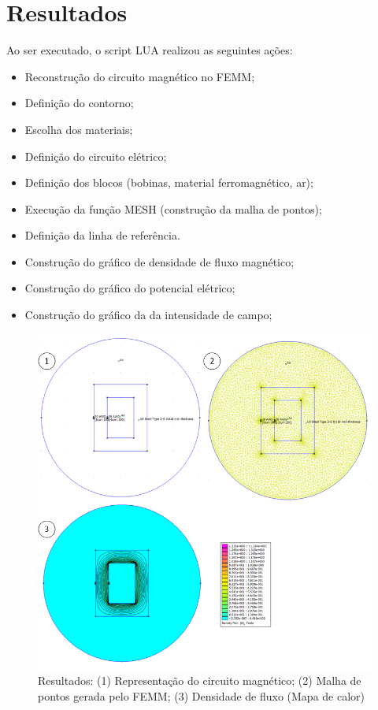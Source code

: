 \section{Resultados}
\label{cap2:resultados}
Ao ser executado, o script LUA realizou as seguintes ações:
\begin{itemize}
\item Reconstrução do circuito magnético no FEMM;
\item Definição do contorno;
\item Escolha dos materiais;
\item Definição do circuito elétrico;
\item Definição dos blocos (bobinas, material ferromagnético, ar);
\item Execução da função MESH (construção da malha de pontos);
\item Definição da linha de referência.
\item Construção do gráfico de densidade de fluxo magnético;
\item Construção do gráfico do potencial elétrico;
\item Construção do gráfico da da intensidade de campo;
\end{itemize}

\begin{figure}[H]
\centering
\includegraphics[scale=0.7]{img/assig2/results_1.png}
\caption[Resultados]{Resultados: (1) Representação do circuito magnético; (2) Malha de pontos gerada pelo FEMM; (3) Densidade de fluxo (Mapa de calor)}
\label{lua_mesh}
\end{figure}

